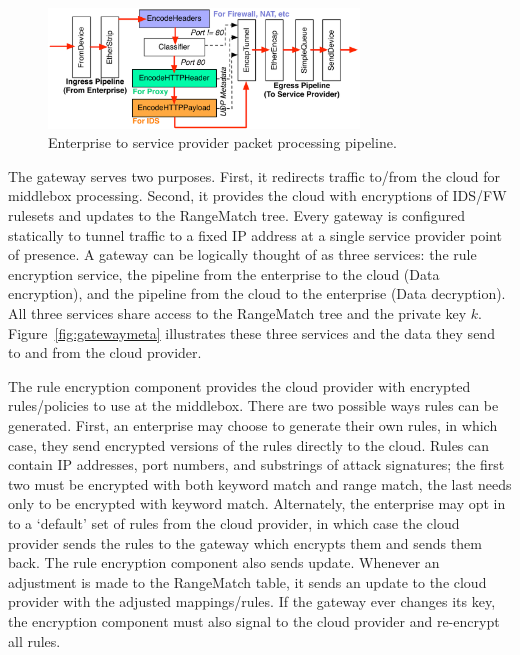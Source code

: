 \begin{figure}[t]
  \centering
  \includegraphics[width=3.25in]{fig/gatewaydiag}
  \caption[]{\label{fig:gateway} Enterprise to service provider packet processing pipeline.}
\end{figure}

The gateway serves two purposes. First, it redirects traffic to/from the cloud for middlebox processing. Second, it provides the cloud with encryptions of IDS/FW rulesets and updates to the RangeMatch tree.
Every gateway is configured statically to tunnel traffic to a fixed IP address at a single service provider point of presence.
A gateway can be logically thought of as three services: the rule encryption service, the pipeline from the enterprise to the cloud (Data encryption), and the pipeline from the cloud to the enterprise (Data decryption). 
All three services share access to the RangeMatch tree and the private key $k$.
Figure~\ref{fig:gatewaymeta} illustrates  these three services and the data they send to and from the cloud provider.

 The rule encryption component provides the cloud provider with encrypted rules/policies to use at the middlebox. 
There are two possible ways rules can be generated. First, an enterprise may choose to generate their own rules, in which case, they send encrypted versions of the rules directly to the cloud.
Rules can contain IP addresses, port numbers, and substrings of attack signatures; the first two must be encrypted with both keyword match and range match, the last needs only to be encrypted with keyword match.
Alternately, the enterprise may opt in to a `default' set of rules from the cloud provider, in which case the cloud provider sends the rules to the gateway which encrypts them and sends them back.
The rule encryption component also sends update. Whenever an adjustment is made to the RangeMatch table, it sends an update to the cloud provider with the adjusted mappings/rules.
If the gateway ever changes its key, the encryption component must also signal to the cloud provider and re-encrypt all rules.

